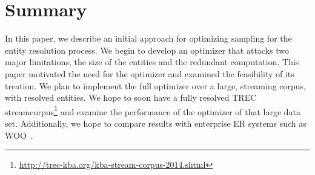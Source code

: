 

\section{Summary}

In this paper, we describe an initial approach for optimizing sampling for the entity resolution process.
We begin to develop an optimizer that attacks two major limitations, the size of the entities and the redundant computation.
This paper motivated the need for the optimizer and examined the feasibility of its treation.
We plan to implement the full optimizer over a large, streaming corpus, with resolved entities.
We hope to soon have a fully resolved TREC streamcorpus\footnote{\url{http://trec-kba.org/kba-stream-corpus-2014.shtml}} and examine the performance of the optimizer of that large data set.
Additionally, we hope to compare results with enterprise ER systems such as WOO~\cite{bellare2013woo}.
